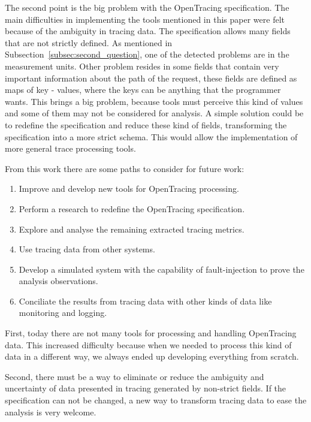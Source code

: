 The second point is the big problem with the OpenTracing specification. The main difficulties in implementing the tools mentioned in this paper were felt because of the ambiguity in tracing data. The specification allows many fields that are not strictly defined. As mentioned in Subsection~\ref{subsec:second_question}, one of the detected problems are in the measurement units. Other problem resides in some fields that contain very important information about the path of the request, these fields are defined as maps of key - values, where the keys can be anything that the programmer wants. This brings a big problem, because tools must perceive this kind of values and some of them may not be considered for analysis. A simple solution could be to redefine the specification and reduce these kind of fields, transforming the specification into a more strict schema. This would allow the implementation of more general trace processing tools.


From this work there are some paths to consider for future work:

\begin{enumerate}
    \item Improve and develop new tools for OpenTracing processing.
    \item Perform a research to redefine the OpenTracing specification. 
    \item Explore and analyse the remaining extracted tracing metrics.
    \item Use tracing data from other systems.
    \item Develop a simulated system with the capability of fault-injection to prove the analysis observations.
    \item Conciliate the results from tracing data with other kinds of data like monitoring and logging.
\end{enumerate}

First, today there are not many tools for processing and handling OpenTracing data. This increased difficulty because when we needed to process this kind of data in a different way, we always ended up developing everything from scratch.

Second, there must be a way to eliminate or reduce the ambiguity and uncertainty of data presented in tracing generated by non-strict fields. If the specification can not be changed, a new way to transform tracing data to ease the analysis is very welcome.

